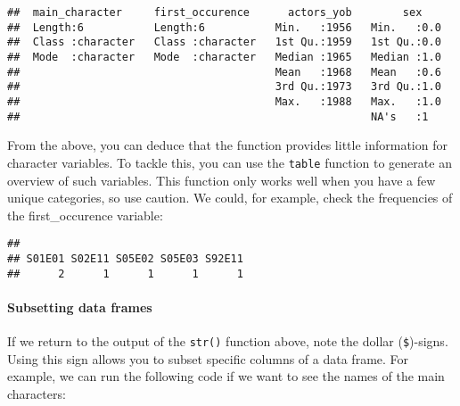 \documentclass[
]{article}
\newenvironment{Shaded}{\begin{snugshade}}{\end{snugshade}}
\newcommand{\FunctionTok}[1]{\textcolor[rgb]{0.00,0.00,0.00}{#1}}
\newcommand{\NormalTok}[1]{#1}
\newcommand{\SpecialCharTok}[1]{\textcolor[rgb]{0.00,0.00,0.00}{#1}}
\begin{document}
\begin{verbatim}
##  main_character     first_occurence      actors_yob        sex     
##  Length:6           Length:6           Min.   :1956   Min.   :0.0  
##  Class :character   Class :character   1st Qu.:1959   1st Qu.:0.0  
##  Mode  :character   Mode  :character   Median :1965   Median :1.0  
##                                        Mean   :1968   Mean   :0.6  
##                                        3rd Qu.:1973   3rd Qu.:1.0  
##                                        Max.   :1988   Max.   :1.0  
##                                                       NA's   :1
\end{verbatim}

From the above, you can deduce that the function provides little
information for character variables. To tackle this, you can use the
\texttt{table} function to generate an overview of such variables. This
function only works well when you have a few unique categories, so use
caution. We could, for example, check the frequencies of the
first\_occurence variable:

\begin{Shaded}
\end{Shaded}

\begin{verbatim}
## 
## S01E01 S02E11 S05E02 S05E03 S92E11 
##      2      1      1      1      1
\end{verbatim}

\hypertarget{subsetting-data-frames}{%
\paragraph{Subsetting data frames}\label{subsetting-data-frames}}

If we return to the output of the \texttt{str()} function above, note
the dollar (\texttt{\$})-signs. Using this sign allows you to subset
specific columns of a data frame. For example, we can run the following
code if we want to see the names of the main characters:

\begin{Shaded}
\end{Shaded}
\end{document}
